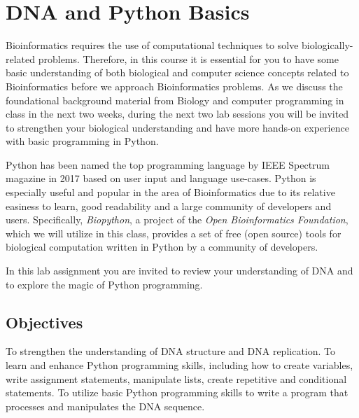 



\long{}



\section*{DNA and Python Basics}

Bioinformatics requires the use of computational techniques to solve biologically-related problems. Therefore, in this course it is essential for you to have some basic understanding of both biological and computer science concepts related to Bioinformatics before we approach Bioinformatics problems. As we discuss the foundational background material from Biology and computer programming in class in the next two weeks, during the next two lab sessions you will be invited to strengthen your biological understanding and have more hands-on experience with basic programming in Python. 

\noindent Python has been named the top  programming language  by IEEE Spectrum magazine in 2017 based on user input and language use-cases. Python is especially useful and popular in the area of Bioinformatics due to its relative easiness to learn, good readability and a large community of developers and users. Specifically, \emph{Biopython}, a project of the \emph{Open Bioinformatics Foundation}, which we will utilize in this class, provides a set of free (open source) tools  for biological computation written in Python by a community of developers. 

\noindent In this lab assignment you are invited to review your understanding of DNA and to explore the magic of Python programming.

\subsection*{Objectives}
To strengthen the understanding of DNA structure and DNA replication. To learn and enhance Python programming skills, including how to create variables, write assignment statements, manipulate lists, create repetitive and conditional statements. To utilize basic Python programming skills to write a program that processes and manipulates the DNA sequence.


